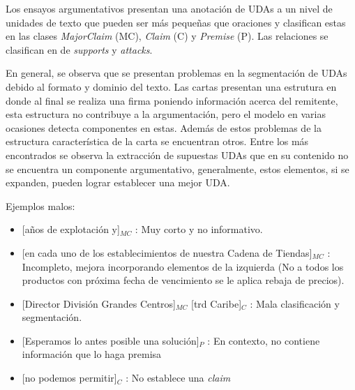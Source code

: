 Los ensayos argumentativos presentan una anotación de UDAs a un nivel de unidades de texto que pueden ser 
más pequeñas que oraciones y clasifican estas en las clases \emph{MajorClaim} (MC), \emph{Claim} (C) y \emph{Premise} 
(P). Las relaciones se clasifican en de \emph{supports} y \emph{attacks}. 

En general, se observa que se presentan problemas en la segmentación de UDAs debido al formato y dominio del texto.
Las cartas presentan una estrutura en donde al final se realiza una firma poniendo información acerca del remitente,
esta estructura no contribuye a la argumentación, pero el modelo en varias ocasiones detecta componentes en estas. 
Además de estos problemas de la estructura característica de la carta se encuentran otros. Entre los más 
encontrados se observa la extracción de supuestas UDAs que en su contenido no se encuentra un componente argumentativo, 
generalmente, estos elementos, si se expanden, pueden lograr establecer una mejor UDA.

Ejemplos malos:
\begin{itemize}
	\item \text{} [años de explotación y]$_{MC}$ 
	: Muy corto y no informativo. %
	\item \text{} [en cada uno de los establecimientos de nuestra Cadena de Tiendas]$_{MC}$ 
	: Incompleto, mejora incorporando elementos de la izquierda (No a todos los productos con próxima fecha de vencimiento se le aplica rebaja de precios). %
	\item \text{} [Director División Grandes Centros]$_{MC}$ [trd Caribe]$_{C}$ 
	: Mala clasificación y segmentación. %
	\item \text{} [Esperamos lo antes posible una solución]$_{P}$ 
	: En contexto, no contiene información que lo haga premisa %
	\item \text{} [no podemos permitir]$_{C}$ 
	: No establece una \emph{claim} %
\end{itemize}

